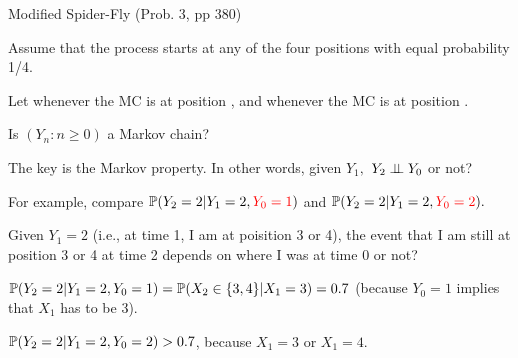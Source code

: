 
\begin{frame}{Modified Spider-Fly (Prob. 3, pp 380)}

\small
\plitemsep 0.05in

\bci 
\item<1-> Assume that the process starts at  any of the four positions with equal probability 1/4. 

\item<2-> Let  whenever the MC is at position , and
   whenever the MC is at position . 

\item<3-> Is $(Y_n: n \ge 0)$ a Markov chain?  \hfill {}

\item<4-> The key is the Markov property. In other words, given $Y_1,$
  $Y_2 \perp \!\!\! \perp Y_0$ or not? 

\item<5-> For example, compare $\mathbb{P}( Y_2 = 2 | Y_1 = 2, {\color{red} Y_0 = 1} )$ and
  $\mathbb{P}( Y_2 = 2 | Y_1 = 2, {\color{red} Y_0 = 2} ).$
\item<6-> Given $Y_1 = 2$ (i.e., at time 1, I am at poisition 3 or 4),
  the event that I am still at position 3 or 4 at time 2 depends on where I was
  at time 0 or not? \hfill {}


\item<7-> $\mathbb{P}( Y_2 = 2 | Y_1 = 2, Y_0 = 1 ) = \mathbb{P}( X_2 \in \{3,4 \} |
    X_1 = 3 ) = 0.7$ (because $Y_0 =1$ implies that $X_1$ has to be 3). 

\item<8-> $\mathbb{P}( Y_2 = 2 | Y_1 = 2, Y_0 = 2 )>0.7$, because $X_1=3$ or $X_1=4.$

\item<9-> 
  \eci 

\end{frame}



